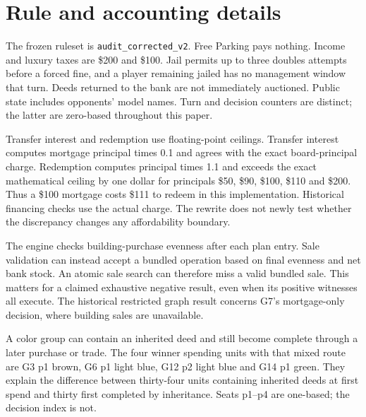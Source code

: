 \section{Rule and accounting details}
\label{app:rules}

The frozen ruleset is \texttt{audit\_corrected\_v2}. Free Parking pays nothing. Income and luxury taxes are \$200 and \$100. Jail permits up to three doubles attempts before a forced fine, and a player remaining jailed has no management window that turn. Deeds returned to the bank are not immediately auctioned. Public state includes opponents' model names. Turn and decision counters are distinct; the latter are zero-based throughout this paper.

Transfer interest and redemption use floating-point ceilings. Transfer interest computes mortgage principal times 0.1 and agrees with the exact board-principal charge. Redemption computes principal times 1.1 and exceeds the exact mathematical ceiling by one dollar for principals \$50, \$90, \$100, \$110 and \$200. Thus a \$100 mortgage costs \$111 to redeem in this implementation. Historical financing checks use the actual charge. The rewrite does not newly test whether the discrepancy changes any affordability boundary.

The engine checks building-purchase evenness after each plan entry. Sale validation can instead accept a bundled operation based on final evenness and net bank stock. An atomic sale search can therefore miss a valid bundled sale. This matters for a claimed exhaustive negative result, even when its positive witnesses all execute. The historical restricted graph result concerns G7's mortgage-only decision, where building sales are unavailable.

A color group can contain an inherited deed and still become complete through a later purchase or trade. The four winner spending units with that mixed route are G3 p1 brown, G6 p1 light blue, G12 p2 light blue and G14 p1 green. They explain the difference between thirty-four units containing inherited deeds at first spend and thirty first completed by inheritance. Seats p1--p4 are one-based; the decision index is not.

